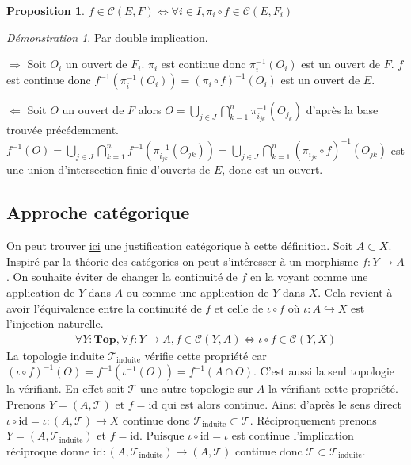 \documentclass[a4paper, 11pt, french]{book}
\newenvironment{centre}{\center}{\endcenter}
\newenvironment{itemise}{\itemize}{\enditemize}
\theoremstyle{plain} %
\newtheorem{proposition}{Proposition}
\theoremstyle{definition} %
\theoremstyle{remark} %
\newtheorem*{demonstration}{Démonstration}
\newcommand{\1}{\mathds{1}}
\newcommand{\id}{\mathrm{id}}
\newcommand{\inv}[1]{#1^{-1}}
\renewcommand{\cal}[1]{\mathcal{#1}}
\newcommand{\scr}[1]{\mathscr{#1}}
\renewcommand{\rm}[1]{\mathrm{#1}}
\newcommand\equivalence[3]{
	\begin{demonstration}
		#1
		\begin{itemise}
			\item[$\Longrightarrow$] #2
			\item[$\Longleftarrow$] #3
		\end{itemise}
	\end{demonstration}
}
\begin{document}
\begin{proposition}
	$f\in\cal{C}(E, F)\iff\forall i\in I, \pi_i\circ f\in\cal{C}(E, F_i)$
\end{proposition}

\equivalence{Par double implication.}{
	Soit $O_i$ un ouvert de $F_i$.
		$\pi_i$ est continue donc $\inv{\pi_i}(O_i)$ est un ouvert de $F$.
		$f$ est continue donc $\inv{f}(\inv{\pi_i}(O_i))=\inv{(\pi_i\circ f)}(O_i)$ est un ouvert de $E$.
}{
	Soit $O$ un ouvert de $F$ alors $O=\bigcup_{j\in J}\bigcap_{k=1}^n\inv{\pi_{i_{jk}}}(O_{j_k})$ d'après la base trouvée précédemment.
		$\inv{f}(O)=\bigcup_{j\in J}\bigcap_{k=1}^n\inv{f}(\inv{\pi_{i_{jk}}}(O_{jk}))=\bigcup_{j\in J}\bigcap_{k=1}^n\inv{(\pi_{i_{jk}}\circ f)}(O_{jk})$ est une union d'intersection finie d'ouverts de $E$, donc est un ouvert.
}

\subsection{Approche catégorique}

On peut trouver \href{https://www.youtube.com/watch?v=xMmQrqdOkwI}{ici} une justification catégorique à cette définition.
Soit $A\subset X$.
Inspiré par la théorie des catégories on peut s'intéresser à un morphisme $f\colon Y\rightarrow A$.
On souhaite éviter de changer la continuité de $f$ en la voyant comme une application de $Y$ dans $A$ ou comme une application de $Y$ dans $X$.
Cela revient à avoir l'équivalence entre la continuité de $f$ et celle de $\iota\circ f$ où $\iota\colon A\hookrightarrow X$ est l'injection naturelle.
\begin{align*}
\forall Y\colon\mathbf{Top}, \forall f\colon Y\rightarrow A, f\in\mathcal{C}(Y, A)\iff \iota\circ f\in\mathcal{C}(Y, X)
\end{align*}
La topologie induite $\scr{T}_\rm{induite}$ vérifie cette propriété car $(\iota\circ f)^{-1}(O)=f^{-1}(\iota^{-1}(O))=f^{-1}(A\cap O)$.
C'est aussi la seul topologie la vérifiant.
En effet soit $\scr{T}$ une autre topologie sur $A$ la vérifiant cette propriété.
Prenons $Y=(A, \scr{T})$ et $f=\id$ qui est alors continue.
Ainsi d'après le sens direct $\iota\circ\id=\iota\colon(A, \scr{T})\rightarrow X$ continue donc $\scr{T}_\rm{induite}\subset\scr{T}$.
Réciproquement prenons $Y=(A, \scr{T}_\rm{induite})$ et $f=\id$.
Puisque $\iota\circ\id=\iota$ est continue l'implication réciproque donne $\id\colon(A, \scr{T}_\rm{induite})\rightarrow(A, \scr{T})$ continue donc $\scr{T}\subset\scr{T}_\rm{induite}$.
\end{document}

